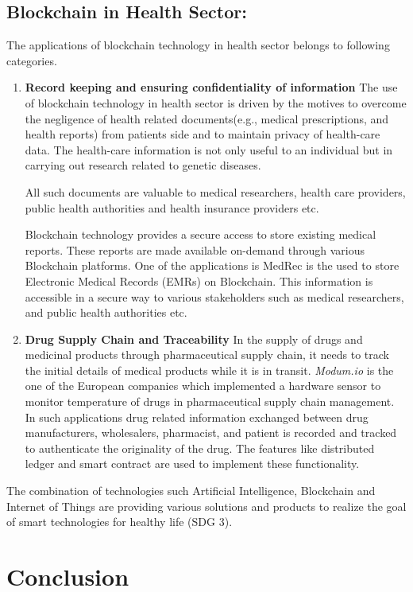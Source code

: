\documentclass[10pt]{IETBook}
\begin{document}
\subsection{Blockchain in Health Sector:}
The applications of blockchain technology in health sector belongs to following categories.
\begin{enumerate}
    \item {\bf Record keeping and ensuring confidentiality of information} The use of blockchain technology in health sector is driven by the motives to overcome the negligence of health related documents(e.g., medical prescriptions, and health reports) from patients side and to maintain privacy of health-care data. The health-care information is not only useful to an individual but in carrying out research related to genetic diseases.
    
    All such documents are valuable to medical researchers, health care providers, public health authorities and health insurance providers etc. 
    
    Blockchain technology provides a secure access to store existing  medical reports. These reports are made available on-demand through various Blockchain platforms. One of the applications is MedRec\cite{ekblaw2016case} is the used to store Electronic Medical Records (EMRs) on Blockchain. This information is accessible in a secure way to various  stakeholders such as medical researchers, and public health authorities etc. 
    
    \item{\bf Drug Supply Chain and Traceability}
    In the supply of drugs and medicinal products through pharmaceutical supply chain,  it needs to track the initial details of medical products while it is in transit. \textit{Modum.io} is the one of the European companies which implemented a hardware sensor to monitor temperature of drugs in pharmaceutical supply chain management. In such applications drug related information exchanged between drug manufacturers, wholesalers, pharmacist, and patient is recorded and tracked to authenticate the originality of the drug. 
    The features like distributed ledger and smart contract are used to implement these functionality.
\end{enumerate}

The combination of technologies such Artificial Intelligence, Blockchain and Internet of Things are providing various solutions and products to realize the goal of smart technologies for healthy life (SDG 3).

\section{Conclusion}




\end{document}
